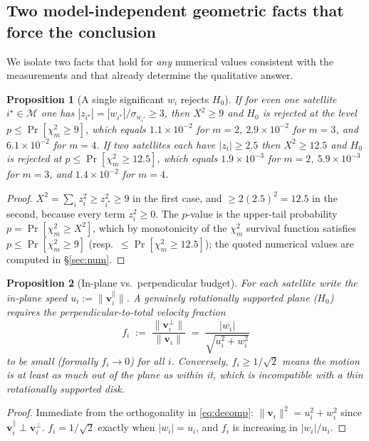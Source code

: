 \documentclass{amsart}
\newtheorem{proposition}{Proposition}
\theoremstyle{definition}
\begin{document}
\subsection{Two model-independent geometric facts that force the conclusion}
We isolate two facts that hold for \emph{any} numerical values consistent
with the measurements and that already determine the qualitative answer.

\begin{proposition}[A single significant $w_i$ rejects $H_0$]\label{prop:one}
If for even one satellite $i^\star\in\mathcal M$ one has
$|z_{i^\star}|=|w_{i^\star}|/\sigma_{w_{i^\star}}\ge 3$, then
$X^2\ge9$ and $H_0$ is rejected at the level $p\le\Pr[\chi^2_m\ge9]$, which
equals $1.1\times10^{-2}$ for $m=2$, $2.9\times10^{-2}$ for $m=3$, and
$6.1\times10^{-2}$ for $m=4$. If two satellites each have $|z_i|\ge 2.5$
then $X^2\ge12.5$ and $H_0$ is rejected at $p\le\Pr[\chi^2_m\ge12.5]$, which
equals $1.9\times10^{-3}$ for $m=2$, $5.9\times10^{-3}$ for $m=3$, and
$1.4\times10^{-2}$ for $m=4$.
\end{proposition}
\begin{proof}
$X^2=\sum_i z_i^2 \ge z_{i^\star}^2 \ge 9$ in the first case, and
$\ge 2(2.5)^2=12.5$ in the second, because every term $z_i^2\ge0$. The
$p$-value is the upper-tail probability $p=\Pr[\chi^2_m\ge X^2]$, which by
monotonicity of the $\chi^2_m$ survival function satisfies
$p\le\Pr[\chi^2_m\ge9]$ (resp.\ $\le\Pr[\chi^2_m\ge12.5]$); the quoted
numerical values are computed in \S\ref{sec:num}.
\end{proof}

\begin{proposition}[In-plane vs.\ perpendicular budget]\label{prop:budget}
For each satellite write the in-plane speed
$u_i:=\|\bm v_i^{\parallel}\|$. A genuinely rotationally supported plane
($H_0$) requires the perpendicular-to-total velocity fraction
\begin{equation}\label{eq:frac}
  f_i \;:=\; \frac{\|\bm v_i^{\perp}\|}{\|\bm v_i\|}
        \;=\; \frac{|w_i|}{\sqrt{u_i^2+w_i^2}}
\end{equation}
to be small (formally $f_i\to0$) for all $i$. Conversely, $f_i\ge
1/\sqrt2$ means the motion is at least as much out of the plane as within
it, which is incompatible with a thin rotationally supported disk.
\end{proposition}
\begin{proof}
Immediate from the orthogonality in \eqref{eq:decomp}:
$\|\bm v_i\|^2=u_i^2+w_i^2$ since $\bm v_i^{\parallel}\perp\bm v_i^{\perp}$.
$f_i=1/\sqrt2$ exactly when $|w_i|=u_i$, and $f_i$ is increasing in
$|w_i|/u_i$.
\end{proof}
\end{document}
